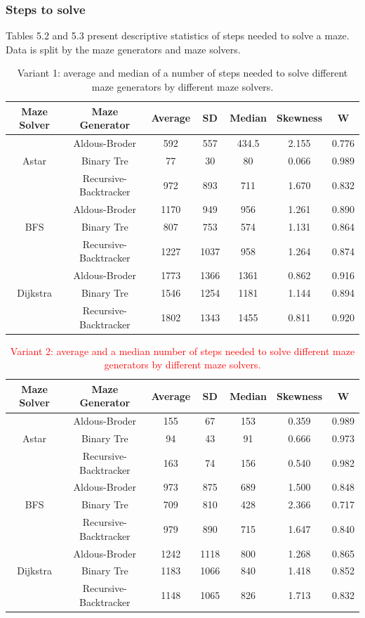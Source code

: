 \subsubsection{Steps to solve}
Tables 5.2 and 5.3 present descriptive statistics of steps needed to solve a maze. Data is split by the maze generators and maze solvers. 
\begin{table}[!ht]
    \centering
    \caption{Variant 1: average and median of a number of steps needed to solve different maze generators by different maze solvers.} 
    \begin{tabular}{c c c c c c c}
    \hline
        Maze Solver & Maze Generator & Average & SD & Median & Skewness & W\\ \hline
        ~ & Aldous-Broder & 592 & 557 & 434.5 & 2.155 & 0.776\\ 
        Astar & Binary Tre & 77 & 30 & 80 & 0.066 & 0.989 \\ 
        ~ & Recursive-Backtracker & 972 & 893 & 711 & 1.670 & 0.832\\ \hline
        ~ & Aldous-Broder & 1170 & 949 & 956 & 1.261 & 0.890\\ 
        BFS & Binary Tre & 807 & 753 & 574 & 1.131 & 0.864\\ 
        ~ & Recursive-Backtracker & 1227 & 1037 & 958 & 1.264 & 0.874\\ \hline
        ~ & Aldous-Broder & 1773 & 1366 & 1361 & 0.862 & 0.916\\ 
        Dijkstra & Binary Tre & 1546 & 1254 & 1181 & 1.144 & 0.894\\ 
        ~ & Recursive-Backtracker & 1802 & 1343 & 1455 & 0.811 & 0.920\\ \hline
    \end{tabular}
\end{table}
\begin{table}[!ht]
    \centering
    \caption{\textcolor{red}{Variant 2: average and a median number of steps needed to solve different maze generators by different maze solvers.}}
    \begin{tabular}{c c c c c c c}
    \hline
        Maze Solver & Maze Generator & Average & SD & Median & Skewness & W\\ \hline
        ~ & Aldous-Broder & 155 & 67 & 153 & 0.359 & 0.989\\ 
        Astar & Binary Tre & 94 & 43 & 91 & 0.666 & 0.973 \\ 
        ~ & Recursive-Backtracker & 163 & 74 & 156 & 0.540 & 0.982\\ \hline
        ~ & Aldous-Broder & 973 & 875 & 689 & 1.500 & 0.848 \\ 
        BFS & Binary Tre & 709 & 810 & 428 & 2.366 & 0.717 \\ 
        ~ & Recursive-Backtracker & 979 & 890 & 715 & 1.647 & 0.840 \\ \hline
        ~ & Aldous-Broder & 1242 & 1118 & 800 & 1.268 & 0.865\\ 
        Dijkstra & Binary Tre & 1183 & 1066 & 840 & 1.418 & 0.852\\ 
        ~ & Recursive-Backtracker & 1148 & 1065 & 826 & 1.713 & 0.832\\ \hline
    \end{tabular}
\end{table}    
